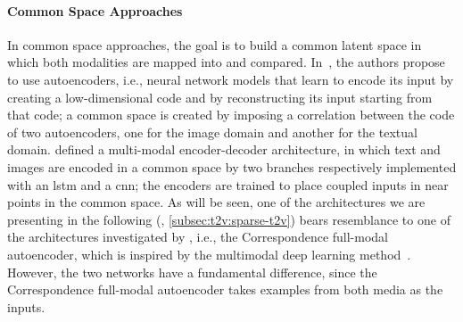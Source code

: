 \paragraph{Common Space Approaches}
In common space approaches, the goal is to build a common latent space in which both modalities are mapped into and compared.
In~\cite{ngiam2011multimodal,feng2014cross}, the authors propose to use autoencoders, i.e., neural network models that learn to encode its input by creating a low-dimensional code and by reconstructing its input starting from that code;
a common space is created by imposing a correlation between the code of two autoencoders, one for the image domain and another for the textual domain.
\citet{kiros2014unifying} defined a multi-modal encoder-decoder architecture, in which text and images are encoded in a common space by two branches respectively implemented with an \gls{lstm} and a \gls{cnn};
the encoders are trained to place coupled inputs in near points in the common space.
As will be seen, one of the architectures we are presenting in the following (\sparsettv{}, \ref{subsec:t2v:sparse-t2v}) bears resemblance to one of the architectures investigated by \citet{feng2014cross}, i.e., the Correspondence full-modal autoencoder, which is inspired by the multimodal deep learning method~\cite{ngiam2011multimodal}.
However, the two networks have a fundamental difference, since the Correspondence full-modal autoencoder takes examples from both media as the inputs.
%
